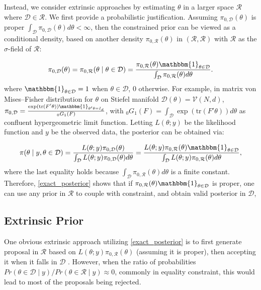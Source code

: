 \documentclass[10pt]{article}
\newcommand{\mc}[1]{\mathcal{#1}}
\DeclareMathOperator{\1}{\mathbbm{1}}
\begin{document}
Instead, we consider extrinsic approaches by estimating $\theta$ in a larger space $\mc R$ where $\mc D\in \mc R$. We first provide a probabilistic justification. Assuming $\pi_{0,\mc D}(\theta)$ is proper $\int_{\mc D} \pi_{0,\mc D}(\theta) d\theta <\infty$, then the constrained prior can be viewed as a conditional density, based on another density $\pi_{0,\mc R}(\theta)$ in $(\mc R, \mathscr R)$ with $\mathscr R$ as the $\sigma$-field of $\mc R$:

\begin{equation}
\begin{aligned}
\pi_{0,\mc D}(\theta)= \pi_{0,\mc R}(\theta \mid \theta \in \mc D) = \frac{ \pi_{0,\mc R}(\theta) \mathbbm{1}_{\theta\in \mc D} }{ \int_{\mc D}  \pi_{0,\mc R}(\theta)d\theta }.
\end{aligned}
\end{equation}
where $\mathbbm{1}_{\theta \in \mc D}=1$ when $\theta \in \mc D$, $0$ otherwise. For example, in matrix von Mises--Fisher distribution for $\theta$ on Stiefel manifold $\mc D(\theta)=\mc V(N,d)$, $\pi_{0,\mc D}=\frac{\exp(\text{tr}(F'\theta))\mathbbm{1}_{\theta'\theta=I_d}}{_0G_1(F)}$, with $_0G_1(F)= \int_{\mc D} \exp(\text{tr}(F'\theta)) d\theta$ as confluent hypergeometric limit function. Letting $L(\theta;y)$ be the likelihood function and $y$ be the observed data, the posterior can be obtained via:

\begin{equation}
\begin{aligned}
\label{exact_posterior}
\pi(\theta \mid y, \theta \in \mc D) = \frac{ L(\theta;y)\pi_{0,\mc D}(\theta)}{\int_{\mc D} L(\theta;y)\pi_{0,\mc D}(\theta) d\theta } = \frac{ L(\theta;y)\pi_{0,\mc R}(\theta) \mathbbm{1}_{\theta\in \mc D} }{\int_{\mc D} L(\theta;y)\pi_{0,\mc R}(\theta) d\theta },
\end{aligned}
\end{equation}
where the last equality holds because $\int_{\mc D}  \pi_{0,\mc R}(\theta) d\theta$ is a finite constant. Therefore, \eqref{exact_posterior} shows that if $\pi_{0,\mc R}(\theta) \mathbbm{1}_{\theta\in \mc D}$ is proper,
one can use any prior in $\mc R$ to couple with constraint, and obtain valid posterior in $\mc D$,


\subsection{Extrinsic Prior}

One obvious extrinsic approach utilizing \eqref{exact_posterior} is to first generate proposal in $\mc R$ based on $L(\theta;y)\pi_{0,\mc R}(\theta)$ (assuming it is proper), then accepting it when it falls in $\mc D$ \citep{gelfand1992bayesian}. However, when the ratio of probabilities $Pr(\theta\in \mc D \mid y) / Pr(\theta\in \mc R \mid y) \approx 0$, commonly in equality constraint, this would lead to most of the proposals being rejected.
\end{document}
